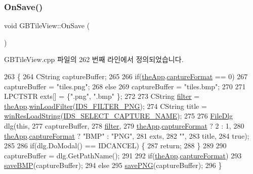 \subsubsection{\texorpdfstring{On\+Save()}{OnSave()}}
{\footnotesize\ttfamily void G\+B\+Tile\+View\+::\+On\+Save (\begin{DoxyParamCaption}{ }\end{DoxyParamCaption})\hspace{0.3cm}{\ttfamily [protected]}}



G\+B\+Tile\+View.\+cpp 파일의 262 번째 라인에서 정의되었습니다.


\begin{DoxyCode}
263 \{
264   CString captureBuffer;
265 
266   \textcolor{keywordflow}{if}(\mbox{\hyperlink{_v_b_a_8cpp_a8095a9d06b37a7efe3723f3218ad8fb3}{theApp}}.\mbox{\hyperlink{class_v_b_a_a103f0b25433c57c4458a208a06799cf8}{captureFormat}} == 0)
267     captureBuffer = \textcolor{stringliteral}{"tiles.png"};
268   \textcolor{keywordflow}{else}
269     captureBuffer = \textcolor{stringliteral}{"tiles.bmp"};
270 
271   LPCTSTR exts[] = \{\textcolor{stringliteral}{".png"}, \textcolor{stringliteral}{".bmp"} \};
272 
273   CString \mbox{\hyperlink{_s_d_l_8cpp_af0122ee4312107103b580a98c74a4ea6}{filter}} = \mbox{\hyperlink{_v_b_a_8cpp_a8095a9d06b37a7efe3723f3218ad8fb3}{theApp}}.\mbox{\hyperlink{class_v_b_a_a228edf26b0dc4129658c174ee5a3c27c}{winLoadFilter}}(\mbox{\hyperlink{resource_8h_a374944c3928d8197bc2bbf9e85207a4d}{IDS\_FILTER\_PNG}});
274   CString title = \mbox{\hyperlink{_win_res_util_8cpp_a416e85e80ab9b01376e87251c83d1a5a}{winResLoadString}}(\mbox{\hyperlink{resource_8h_a10c24c77703afe57f6e641e939997cd2}{IDS\_SELECT\_CAPTURE\_NAME}});
275 
276   \mbox{\hyperlink{class_file_dlg}{FileDlg}} dlg(\textcolor{keyword}{this},
277               captureBuffer,
278               \mbox{\hyperlink{_s_d_l_8cpp_af0122ee4312107103b580a98c74a4ea6}{filter}},
279               \mbox{\hyperlink{_v_b_a_8cpp_a8095a9d06b37a7efe3723f3218ad8fb3}{theApp}}.\mbox{\hyperlink{class_v_b_a_a103f0b25433c57c4458a208a06799cf8}{captureFormat}} ? 2 : 1,
280               \mbox{\hyperlink{_v_b_a_8cpp_a8095a9d06b37a7efe3723f3218ad8fb3}{theApp}}.\mbox{\hyperlink{class_v_b_a_a103f0b25433c57c4458a208a06799cf8}{captureFormat}} ? \textcolor{stringliteral}{"BMP"} : \textcolor{stringliteral}{"PNG"},
281               exts,
282               \textcolor{stringliteral}{""},
283               title,
284               \textcolor{keyword}{true});
285 
286   \textcolor{keywordflow}{if}(dlg.DoModal() == IDCANCEL) \{
287     \textcolor{keywordflow}{return};
288   \}
289 
290   captureBuffer = dlg.GetPathName();
291 
292   \textcolor{keywordflow}{if}(\mbox{\hyperlink{_v_b_a_8cpp_a8095a9d06b37a7efe3723f3218ad8fb3}{theApp}}.\mbox{\hyperlink{class_v_b_a_a103f0b25433c57c4458a208a06799cf8}{captureFormat}})
293     \mbox{\hyperlink{class_g_b_tile_view_ac61ccd982b57db14794e1f9febc67c16}{saveBMP}}(captureBuffer);
294   \textcolor{keywordflow}{else}
295     \mbox{\hyperlink{class_g_b_tile_view_a7d48513402a49269828c3111bc153d46}{savePNG}}(captureBuffer);  
296 \}
\end{DoxyCode}

